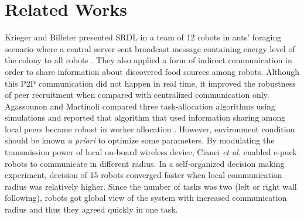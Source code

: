 \documentclass[letterpaper, 10 pt, conference]{ieeeconf}  %
\begin{document}
\section{Related Works}
\label{sec:bg}
Krieger and Billeter presented SRDL in a team of 12 robots in ants' foraging scenario where a   central server sent broadcast message containing energy level of the colony to all robots \cite{Krieger}. They also applied a form of indirect communication  in order to share information about discovered food sources among robots. Although this P2P communication did not happen in real time,  it improved the robustness of peer recruitment when compared  with centralized communication only. Agassounon and Martinoli compared three task-allocation algorithms using simulations and reported that algorithm that used information sharing among local peers became robust in worker allocation \cite{Agassounon}. However, environment condition should be known {\em a priori} to optimize some parameters.  By modulating the transmission power of local on-board wireless device, Cianci {\em et  al.} enabled  e-puck robots to communicate in different radius. In a self-organized decision making experiment, decision of 15 robots converged faster when local communication radius was relatively  higher. Since the number of tasks was two (left or right wall following), robots got global view of the system with increased communication radius and  thus they agreed quickly in one task.
\end{document}
